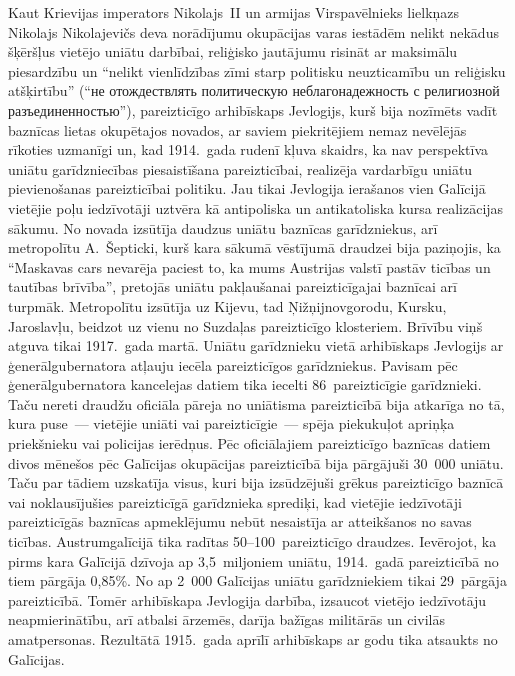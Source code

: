 \documentclass[twoside,a5paper,12pt,fleqn,openany]{extbook}
\newcommand{\rutxti}[1]{\textrussian{#1}}
\begin{document}
Kaut Krievijas imperators Nikolajs~II un armijas Virspavēlnieks lielkņazs Nikolajs Nikolajevičs deva norādījumu okupācijas varas iestādēm nelikt nekādus šķēršļus vietējo uniātu darbībai, reliģisko jautājumu risināt ar maksimālu piesardzību un ``nelikt vienlīdzības zīmi starp politisku neuzticamību un reliģisku atšķirtību'' (``\rutxti{не отождествлять политическую неблагонадежность с религиозной разъединенностью}''), pareizticīgo arhibīskaps Jevlogijs, kurš bija nozīmēts vadīt baznīcas lietas okupētajos novados, ar saviem piekritējiem nemaz nevēlējās rīkoties uzmanīgi un, kad 1914.~gada rudenī kļuva skaidrs, ka nav perspektīva uniātu garīdzniecības piesaistīšana pareizticībai, realizēja vardarbīgu uniātu pievienošanas pareizticībai politiku. Jau tikai Jevlogija ierašanos vien Galīcijā vietējie poļu iedzīvotāji uztvēra kā antipoliska un antikatoliska kursa realizācijas sākumu. No novada izsūtīja daudzus uniātu baznīcas garīdzniekus, arī metropolītu A.~Šepticki, kurš kara sākumā vēstījumā draudzei bija paziņojis, ka ``Maskavas cars nevarēja paciest to, ka mums Austrijas valstī pastāv ticības un tautības brīvība'', pretojās uniātu pakļaušanai pareizticīgajai baznīcai arī turpmāk. Metropolītu izsūtīja uz Kijevu, tad Ņižņijnovgorodu, Kursku, Jaroslavļu, beidzot uz vienu no Suzdaļas pareizticīgo klosteriem. Brīvību viņš atguva tikai 1917.~gada martā. Uniātu garīdznieku vietā arhibīskaps Jevlogijs ar ģenerālgubernatora atļauju iecēla pareizticīgos garīdzniekus. Pavisam pēc ģenerālgubernatora kancelejas datiem tika iecelti 86~pareizticīgie garīdznieki. Taču nereti draudžu oficiāla pāreja no uniātisma pareizticībā bija atkarīga no tā, kura puse~--- vietējie uniāti vai pareizticīgie~--- spēja piekukuļot apriņķa priekšnieku vai policijas ierēdņus. Pēc oficiālajiem pareizticīgo baznīcas datiem divos mēnešos pēc Galīcijas okupācijas pareizticībā bija pārgājuši 30~000 uniātu. Taču par tādiem uzskatīja visus, kuri bija izsūdzējuši grēkus pareizticīgo baznīcā vai noklausījušies pareizticīgā garīdznieka sprediķi, kad vietējie iedzīvotāji pareizticīgās baznīcas apmeklējumu nebūt nesaistīja ar atteikšanos no savas ticības. Austrumgalīcijā tika radītas 50--100~pareizticīgo draudzes. Ievērojot, ka pirms kara Galīcijā dzīvoja ap 3,5~miljoniem uniātu, 1914.~gadā pareizticībā no tiem pārgāja 0,85\%. No ap 2~000 Galīcijas uniātu garīdzniekiem tikai 29~pārgāja pareizticībā. Tomēr arhibīskapa Jevlogija darbība, izsaucot vietējo iedzīvotāju neapmierinātību, arī atbalsi ārzemēs, darīja bažīgas militārās un civilās amatpersonas. Rezultātā 1915.~gada aprīlī arhibīskaps ar godu tika atsaukts no Galīcijas.
\end{document}
